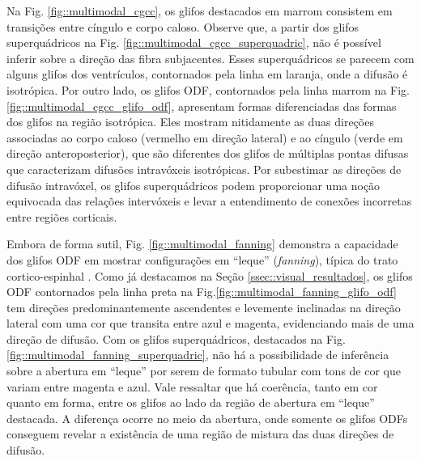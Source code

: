 

Na Fig. \ref{fig::multimodal_cgcc}, os glifos destacados em marrom consistem em transições entre cíngulo e corpo caloso. Observe que, a partir dos glifos superquádricos na Fig. \ref{fig::multimodal_cgcc_superquadric}, não é possível inferir sobre a direção das fibra subjacentes. Esses superquádricos se parecem com alguns glifos dos ventrículos, contornados pela linha em laranja, onde a difusão é isotrópica. Por outro lado, os glifos ODF, contornados pela linha marrom na Fig. \ref{fig::multimodal_cgcc_glifo_odf}, apresentam formas diferenciadas das formas dos glifos na região isotrópica. Eles mostram nitidamente as duas direções associadas ao corpo caloso (vermelho em direção lateral) e ao cíngulo (verde em direção anteroposterior), que são diferentes dos glifos de múltiplas pontas difusas que caracterizam difusões intravóxeis isotrópicas. Por subestimar as direções de difusão intravóxel, os glifos superquádricos podem proporcionar uma noção equivocada das relações intervóxeis e levar a entendimento de conexões incorretas entre regiões corticais.%


Embora de forma sutil, Fig. \ref{fig::multimodal_fanning} demonstra a capacidade dos glifos ODF em mostrar configurações em ``leque'' (\textit{fanning}), típica do trato cortico-espinhal \cite{fortin2012, wang2019}. Como já destacamos na Seção \ref{ssec::visual_resultados}, os glifos ODF contornados pela linha preta na Fig.\ref{fig::multimodal_fanning_glifo_odf} tem  direções predominantemente ascendentes e levemente inclinadas na direção lateral com uma cor que transita entre azul e magenta, evidenciando mais de uma direção de difusão. Com os glifos superquádricos, destacados na Fig. \ref{fig::multimodal_fanning_superquadric}, não há a possibilidade de inferência sobre a abertura em ``leque'' por serem de formato tubular com tons de cor que variam entre magenta e azul. Vale ressaltar que há coerência, tanto em cor quanto em forma, entre os glifos ao lado da região de abertura em ``leque'' destacada. A diferença ocorre no meio da abertura, onde somente os glifos ODFs conseguem revelar a existência de uma região de mistura das duas direções de difusão.

